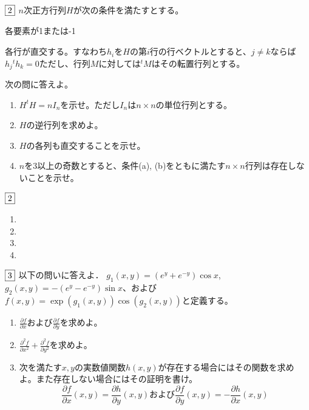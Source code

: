 \documentclass[dvipdfmx]{jsreport}
\newcounter{num}[section]
\begin{document}
\begin{tcolorbox} %
	$\fbox{2}$ $n$次正方行列$H$が次の条件を満たすとする。
\begin{enumerate_alpha}
	\item 各要素が1または-1
	\item 各行が直交する。すなわち$h_i$を$H$の第$i$行の行ベクトルとすると、$j\ne k$ならば$h_j{}^t h_k= 0$ただし、行列$M$に対しては${}^t M$はその転置行列とする。
\end{enumerate_alpha}
	次の問に答えよ。
\begin{enumerate}
	\item $H^t H= nI_n$を示せ。ただし$I_n$は$n\times n$の単位行列とする。
	\item  $H$の逆行列を求めよ。
	\item $H$の各列も直交することを示せ。
	\item $n$を3以上の奇数とすると、条件(a), (b)をともに満たす$n\times n$行列は存在しないことを示せ。
\end{enumerate}
\end{tcolorbox}

\begin{answer} %
	$\fbox{2}$
\begin{enumerate}
	\item 
	\item 
	\item 
	\item 
\end{enumerate}
\end{answer}

\begin{tcolorbox} %
	$\fbox{3}$ 以下の問いに答えよ．
	$g_1(x, y)= (e^y+ e^{-y})\cos{x}$, $g_2(x, y)= -(e^y- e^{-y})\sin{x}$、および$f(x, y)= \exp{(g_1(x, y))}\cos{(g_2(x, y))}$と定義する。
\begin{enumerate}
	\item $\frac{\partial f}{\partial x}$および$\frac{\partial f}{\partial y}$を求めよ。
	\item $\frac{\partial^2 f}{\partial x^2}+ \frac{\partial^2 f}{\partial y^2}$を求めよ。
	\item 次を満たす$x, y$の実数値関数$h(x, y)$が存在する場合にはその関数を求めよ。また存在しない場合にはその証明を書け。
\begin{equation*}
	\frac{\partial f}{\partial x}(x, y)= \frac{\partial h}{\partial y}(x, y) および\frac{\partial f}{\partial y}(x, y)= -\frac{\partial h}{\partial x}(x, y)
\end{equation*}
\end{enumerate}
\end{tcolorbox}
\end{document}
